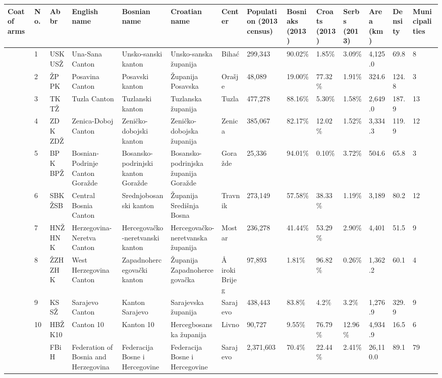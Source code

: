 \documentclass{article}
\begin{document}
\begin{tabular}{llllllllllllll}
\toprule
Coat of arms & No. & Abbr & English name & Bosnian name & Croatian name & Center & Population (2013 census) & Bosniaks (2013) & Croats (2013) & Serbs (2013) & Area (km) & Density & Municipalities \\
\midrule
 & 1 & USK USŽ & Una-Sana Canton & Unsko-sanski kanton & Unsko-sanska županija & Bihać & 299,343 & 90.02\% & 1.85\% & 3.09\% & 4,125.0 & 69.8 & 8 \\
 & 2 & ŽP PK & Posavina Canton & Posavski kanton & Županija Posavska & Orašje & 48,089 & 19.00\% & 77.32\% & 1.91\% & 324.6 & 124.8 & 3 \\
 & 3 & TK TŽ & Tuzla Canton & Tuzlanski kanton & Tuzlanska županija & Tuzla & 477,278 & 88.16\% & 5.30\% & 1.58\% & 2,649.0 & 187.9 & 13 \\
 & 4 & ZDK ZDŽ & Zenica-Doboj Canton & Zeničko-dobojski kanton & Zeničko-dobojska županija & Zenica & 385,067 & 82.17\% & 12.02\% & 1.52\% & 3,334.3 & 119.9 & 12 \\
 & 5 & BPK BPŽ & Bosnian-Podrinje Canton Goražde & Bosansko-podrinjski kanton Goražde & Bosansko-podrinjska županija Goražde & Goražde & 25,336 & 94.01\% & 0.10\% & 3.72\% & 504.6 & 65.8 & 3 \\
 & 6 & SBK ŽSB & Central Bosnia Canton & Srednjobosanski kanton & Županija Središnja Bosna & Travnik & 273,149 & 57.58\% & 38.33\% & 1.19\% & 3,189 & 80.2 & 12 \\
 & 7 & HNŽ HNK & Herzegovina-Neretva Canton & Hercegovačko-neretvanski kanton & Hercegovačko-neretvanska županija & Mostar & 236,278 & 41.44\% & 53.29\% & 2.90\% & 4,401 & 51.5 & 9 \\
 & 8 & ŽZH ZHK & West Herzegovina Canton & Zapadnohercegovački kanton & Županija Zapadnohercegovačka & Å iroki Brijeg & 97,893 & 1.81\% & 96.82\% & 0.26\% & 1,362.2 & 60.1 & 4 \\
 & 9 & KS SŽ & Sarajevo Canton & Kanton Sarajevo & Sarajevska županija & Sarajevo & 438,443 & 83.8\% & 4.2\% & 3.2\% & 1,276.9 & 329.9 & 9 \\
 & 10 & HBŽ K10 & Canton 10 & Kanton 10 & Hercegbosanska županija & Livno & 90,727 & 9.55\% & 76.79\% & 12.96\% & 4,934.9 & 16.5 & 6 \\
 &  & FBiH & Federation of Bosnia and Herzegovina & Federacija Bosne i Hercegovine & Federacija Bosne i Hercegovine & Sarajevo & 2,371,603 & 70.4\% & 22.44\% & 2.41\% & 26,110.0 & 89.1 & 79 \\
\bottomrule
\end{tabular}
\end{document}
